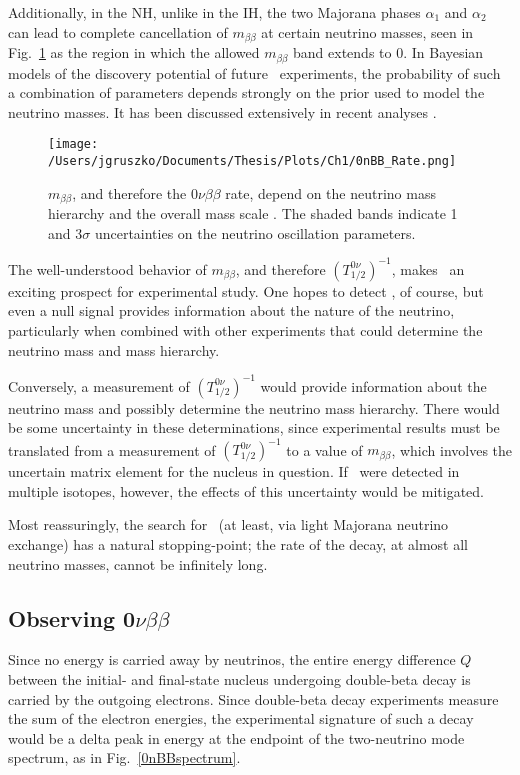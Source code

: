 Additionally, in the NH, unlike in the IH, the two Majorana phases $\alpha_1$ and $\alpha_2$ can lead to complete cancellation of $m_{\beta\beta}$ at certain neutrino masses, seen in Fig.~\ref{fig:0nBBrate} as the region in which the allowed $m_{\beta\beta}$ band extends to 0. In Bayesian models of the discovery potential of future \nonubb\ experiments, the probability of such a combination of parameters depends strongly on the prior used to model the neutrino masses. It has been discussed extensively in recent analyses \cite{Agostini2017} \cite{Caldwell2017}. 
 
  \begin{figure}[h]
 \centering
 \texttt{[image: /Users/jgruszko/Documents/Thesis/Plots/Ch1/0nBB\_Rate.png]}
  \caption[$m_{\beta\beta}$ dependence on the neutrino mass and hierarchy]{$m_{\beta\beta}$, and therefore the $0\nu\beta\beta$ rate, depend on the neutrino mass hierarchy and the overall mass scale \cite{ZuberINT2015}. The shaded bands indicate 1 and 3$\sigma$ uncertainties on the neutrino oscillation parameters. }
  \label{fig:0nBBrate}
  \end{figure}   
  
The well-understood behavior of $m_{\beta\beta}$, and therefore $(T_{1/2}^{0\nu})^{-1}$, makes \nonubb\ an exciting prospect for experimental study. One hopes to detect \nonubb, of course, but even a null signal provides information about the nature of the neutrino, particularly when combined with other experiments that could determine the neutrino mass and mass hierarchy. 

Conversely, a measurement of $(T_{1/2}^{0\nu})^{-1}$ would provide information about the neutrino mass and possibly determine the neutrino mass hierarchy. There would be some uncertainty in these determinations, since experimental results must be translated from a measurement of $(T_{1/2}^{0\nu})^{-1}$ to a value of $m_{\beta\beta}$, which involves the uncertain matrix element for the nucleus in question. If \nonubb\ were detected in multiple isotopes, however, the effects of this uncertainty would be mitigated. 

Most reassuringly, the search for \nonubb\ (at least, via light Majorana neutrino exchange) has a natural stopping-point; the rate of the decay, at almost all neutrino masses, cannot be infinitely long. 

\subsection{Observing 0$\nu\beta\beta$}
Since no energy is carried away by neutrinos, the entire energy difference $Q$ between the initial- and final-state nucleus undergoing double-beta decay is carried by the outgoing electrons. Since double-beta decay experiments measure the sum of the electron energies, the experimental signature of such a decay would be a delta peak in energy at the endpoint of the two-neutrino mode spectrum, as in Fig.~\ref{0nBBspectrum}.

